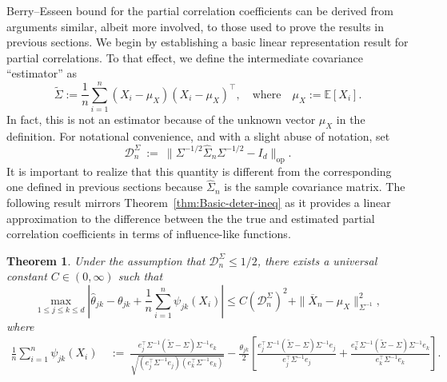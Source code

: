 \documentclass[11pt]{article}
\newtheorem{theorem}{Theorem}
\begin{document}
Berry--Esseen bound for the partial correlation coefficients can be derived from arguments similar, albeit more involved,  to those used to prove the results in previous sections. We begin by establishing a basic linear representation result for partial correlations. To that effect, we define the intermediate covariance ``estimator'' as
\[
\widetilde{\Sigma} := \frac{1}{n}\sum_{i=1}^n (X_i - \mu_X)(X_i - \mu_X)^{\top},\quad\mbox{where}\quad \mu_X := \mathbb{E}[X_i].
\]
In fact, this is not an estimator because of the unknown vector $\mu_X$ in the definition. For notational convenience, and with a slight abuse of notation, set
\begin{equation}\label{eq:D-sigma-notation}
\mathcal{D}_n^{\Sigma} ~:=~ \|\Sigma^{-1/2}\widehat{\Sigma}_n\Sigma^{-1/2} - I_d\|_{\mathrm{op}}. 
\end{equation}
It is important to realize that this quantity is different from the corresponding one defined in previous sections because $\widehat{\Sigma}_n$ is the sample covariance matrix. 
The following result mirrors Theorem~\ref{thm:Basic-deter-ineq} as it provides a linear approximation to the difference between the the true and estimated partial correlation coefficients in terms of influence-like functions. 
\begin{theorem}\label{thm:linear-expansion-partial-corr}
Under the assumption that $\mathcal{D}_n^{\Sigma} \le 1/2$, there exists a universal constant $C\in(0, \infty)$ such that
\[
\max_{1\le j \le k\le d}\left|\widehat{\theta}_{jk} - \theta_{jk} + \frac{1}{n}\sum_{i=1}^n \psi_{jk}(X_i)\right| \le C(\mathcal{D}_n^{\Sigma})^2 + \|\overline{X}_n - \mu_X\|_{\Sigma^{-1}}^2,
\]
 where %
\begin{equation}
\begin{split}
\frac{1}{n}\sum_{i=1}^n \psi_{jk}(X_i) ~&:=~ \frac{e_j^{\top}\Sigma^{-1}(\widetilde{\Sigma} - \Sigma)\Sigma^{-1}e_k}{\sqrt{(e_j^{\top}\Sigma^{-1}e_j)(e_k^{\top}\Sigma^{-1}e_k)}}
- \frac{\theta_{jk}}{2}\left[\frac{e_j^{\top}\Sigma^{-1}(\widetilde{\Sigma} - \Sigma)\Sigma^{-1}e_j}{e_j^{\top}\Sigma^{-1}e_j} + \frac{e_k^{\top}\Sigma^{-1}(\widetilde{\Sigma} - \Sigma)\Sigma^{-1}e_k}{e_k^{\top}\Sigma^{-1}e_k}\right].
\end{split}
\end{equation}
\end{theorem}
\end{document}

